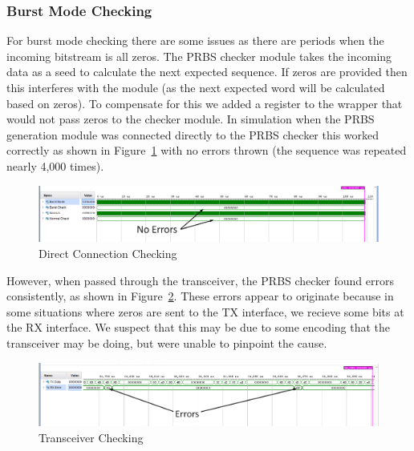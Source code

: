 \subsubsection{Burst Mode Checking}%
\label{ssub:burst_mode_checking}
For burst mode checking there are some issues as there are periods when the
incoming bitstream is all zeros. The PRBS checker module takes the incoming
data as a seed to calculate the next expected sequence. If zeros are provided
then this interferes with the module (as the next expected word will be calculated
based on zeros). To compensate for this we added a register to the wrapper that
would not pass zeros to the checker module. 
In simulation when the PRBS generation module was connected directly to the
PRBS checker this worked correctly as shown in Figure~\ref{fig:burst_check_1}
with no errors thrown (the sequence was repeated nearly 4,000 times). 
\begin{figure}[ht]
    \centering
    \hspace*{-3cm}\includegraphics[width=1.5\linewidth]{img/burst_check.png}
    \caption{Direct Connection Checking}%
    \label{fig:burst_check_1}
\end{figure}

However, when passed through the transceiver, the PRBS checker found errors
consistently, as shown in Figure~\ref{fig:burst_check_2}. 
These errors appear to originate because in some situations where zeros are sent
to the TX interface, we recieve some bits at the RX interface. 
We suspect that this may be due to some encoding that the transceiver may be
doing, but were unable to pinpoint the cause.

\begin{figure}[ht]
    \centering
    \hspace*{-3cm}\includegraphics[width=1.5\linewidth]{img/burst_check_2.png}
    \caption{Transceiver Checking}%
    \label{fig:burst_check_2}
\end{figure}

